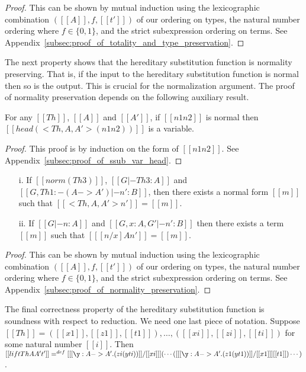\begin{proof}
  This can be shown by mutual induction using the lexicographic
  combination $([[A]], f,[[t']])$ of our ordering on types, the
  natural number ordering where $f \in \{0,1\}$, and the strict
  subexpression ordering on terms. See
  Appendix~\ref{subsec:proof_of_totality_and_type_preservation}.
\end{proof}
The next property shows that the hereditary substitution function is
normality preserving.  That is, if the input to the hereditary
substitution function is normal then so is the output.  This is
crucial for the normalization argument. The proof of normality
preservation depends on the following auxiliary result.
\begin{lemma}
  \label{lemma:ssub_var_head}
  For any $[[Th]]$, $[[A]]$ and $[[A']]$, if $[[n1 n2]]$ is normal then 
  $[[head (<Th,A,A'>(n1 n2))]]$ is a variable.
\end{lemma}
\begin{proof}
  This proof is by induction on the form of $[[n1 n2]]$. See
  Appendix~\ref{subsec:proof_of_ssub_var_head}.
\end{proof}
\begin{lemma}
  \label{lemma:normality_preservation}
  \begin{itemize}
    \item[]
  \item[i.] If $[[norm (Th 3)]]$, $[[G |- Th 3 : A]]$ and $[[G, Th 1:{-(A->A')} |- n' : B]]$, 
    then there exists a normal form $[[m]]$ such that $[[<Th,A,A'>n']] = [[m]]$.
    
  \item[ii.] If $[[G |- n:A]]$ and $[[G, x:A, G' |- n':B]]$ then there exists a term $[[m]]$ 
    such that $[[ [n/x] A n']] = [[m]]$. 
  \end{itemize} 
\end{lemma}
\begin{proof}
  This can be shown by mutual induction using the lexicographic
  combination $([[A]], f,[[t']])$ of our ordering on types, the
  natural number ordering where $f \in \{0,1\}$, and the strict
  subexpression ordering on terms.
  See Appendix~\ref{subsec:proof_of_normality_preservation}.
\end{proof}
\noindent
The final correctness property of the hereditary substitution function is
soundness with respect to reduction.  We need one last piece of notation.
Suppose $[[Th]] = ([[x1]],[[z1]],[[t1]]),\ldots,([[xi]],[[zi]],[[ti]])$ for
some natural number $[[i]]$.
Then $[[lift Th A A' t']] =^{def} [ [[\y:A -> A'.(zi (y ti))]]/[[xi]] ](\cdots([ [[\y:A -> A'.(z1 (y t1))]]/[[x1]] ][[t1]])\cdots)$.

